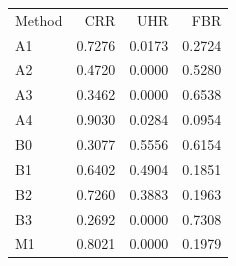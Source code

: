 \begin{tabular}{lrrr}
Method & CRR & UHR & FBR \\
A1 & 0.7276 & 0.0173 & 0.2724 \\
A2 & 0.4720 & 0.0000 & 0.5280 \\
A3 & 0.3462 & 0.0000 & 0.6538 \\
A4 & 0.9030 & 0.0284 & 0.0954 \\
B0 & 0.3077 & 0.5556 & 0.6154 \\
B1 & 0.6402 & 0.4904 & 0.1851 \\
B2 & 0.7260 & 0.3883 & 0.1963 \\
B3 & 0.2692 & 0.0000 & 0.7308 \\
M1 & 0.8021 & 0.0000 & 0.1979 \\
\end{tabular}

